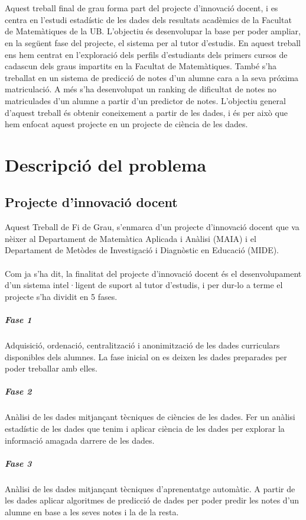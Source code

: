 \documentclass[12pt,a4paper,catalan]{article}
\begin{document}
\\
\\
Aquest treball final de grau forma part del projecte d'innovació docent, i es centra en l'estudi estadístic de les dades dels resultats acadèmics de la Facultat de Matemàtiques de la UB. L'objectiu és desenvolupar la base per poder ampliar, en la següent fase del projecte, el sistema per al tutor d'estudis. En aquest treball ens hem centrat en l'exploració dels perfils d'estudiants dels primers cursos de cadascun dels graus impartits en la Facultat de Matemàtiques. També s'ha treballat en un sistema de predicció de notes d'un alumne cara a la seva próxima matriculació. A més s'ha desenvolupat un ranking de dificultat de notes no matriculades d'un alumne a partir d'un predictor de notes. L'objectiu general d'aquest treball és obtenir coneixement a partir de les dades, i és per això que hem enfocat aquest projecte en un projecte de ciència de les dades.


\newpage


\section{Descripció del problema}
\subsection{Projecte d'innovació docent}
Aquest Treball de Fi de Grau, s'enmarca d'un projecte d'innovació docent \cite{pid} que va nèixer al Departament de Matemàtica Aplicada i Anàlisi (MAIA) i el Departament de Metòdes de Investigació i Diagnòstic en Educació (MIDE).
\\
\\
Com ja s'ha dit, la finalitat del projecte d'innovació docent és el desenvolupament d'un sistema intel·ligent de suport al tutor d'estudis, i per dur-lo a terme el projecte s'ha dividit en 5 fases.

\subparagraph{Fase 1}
Adquisició, ordenació, centralització i anonimització de les dades curriculars disponibles dels alumnes. La fase inicial on es deixen les dades preparades per poder treballar amb elles.

\subparagraph{Fase 2}
Anàlisi de les dades mitjançant tècniques de ciències de les dades. Fer un anàlisi estadístic de les dades que tenim i aplicar ciència de les dades per explorar la informació amagada darrere de les dades.

\subparagraph{Fase 3}
Anàlisi de les dades mitjançant tècniques d’aprenentatge automàtic. A partir de les dades aplicar algoritmes de predicció de dades per poder predir les notes d'un alumne en base a les seves notes i la de la resta.
\end{document}
